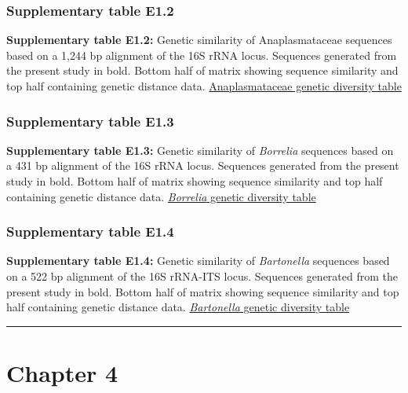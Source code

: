 \documentclass[a4paper, nobind]{templates/ociamthesis}
\begin{document}
\hypertarget{supplementary-table-e1.2}{%
\subsubsection{Supplementary table E1.2}\label{supplementary-table-e1.2}}

\textbf{Supplementary table E1.2:} Genetic similarity of Anaplasmataceae sequences based on a 1,244 bp alignment of the 16S rRNA locus. Sequences generated from the present study in bold. Bottom half of matrix showing sequence similarity and top half containing genetic distance data.
\href{https://ndownloader.figshare.com/files/27452720}{Anaplasmataceae genetic diversity table}

\hypertarget{supplementary-table-e1.3}{%
\subsubsection{Supplementary table E1.3}\label{supplementary-table-e1.3}}

\textbf{Supplementary table E1.3:} Genetic similarity of \emph{Borrelia} sequences based on a 431 bp alignment of the 16S rRNA locus. Sequences generated from the present study in bold. Bottom half of matrix showing sequence similarity and top half containing genetic distance data.
\href{https://ndownloader.figshare.com/files/27452726}{\emph{Borrelia} genetic diversity table}

\hypertarget{supplementary-table-e1.4}{%
\subsubsection{Supplementary table E1.4}\label{supplementary-table-e1.4}}

\textbf{Supplementary table E1.4:} Genetic similarity of \emph{Bartonella} sequences based on a 522 bp alignment of the 16S rRNA-ITS locus. Sequences generated from the present study in bold. Bottom half of matrix showing sequence similarity and top half containing genetic distance data.
\href{https://ndownloader.figshare.com/files/27452723}{\emph{Bartonella} genetic diversity table}

\begin{center}\rule{0.5\linewidth}{0.5pt}\end{center}

\clearpage

\hypertarget{ch4-supp}{%
\section{Chapter 4}\label{ch4-supp}}
\end{document}
